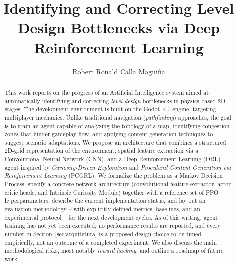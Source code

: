 \documentclass[sigconf,nonacm,language=english]{acmart}
\begin{document}
\title{Identifying and Correcting Level Design Bottlenecks via Deep Reinforcement Learning}

\author{Robert Ronald Calla Maguiña}

\renewcommand{\shortauthors}{Calla Maguiña}

\begin{abstract}
This work reports on the progress of an Artificial Intelligence system aimed
at automatically identifying and correcting \emph{level design} bottlenecks
in physics-based 2D stages. The development environment is built on the
Godot~4.7 engine, targeting multiplayer mechanics. Unlike traditional
navigation (\emph{pathfinding}) approaches, the goal is to train an agent
capable of analyzing the topology of a map, identifying congestion zones
that hinder gameplay flow, and applying content-generation techniques to
suggest scenario adaptations. We propose an architecture that combines a
structured 2D-grid representation of the environment, spatial feature
extraction via a Convolutional Neural Network (CNN), and a Deep
Reinforcement Learning (DRL) agent inspired by \emph{Curiosity-Driven
Exploration} and \emph{Procedural Content Generation via Reinforcement
Learning} (PCGRL). We formalize the problem as a Markov Decision Process,
specify a concrete network architecture (convolutional feature extractor,
actor-critic heads, and Intrinsic Curiosity Module) together with a
reference set of PPO hyperparameters, describe the current implementation
status, and lay out an evaluation methodology -- with explicitly defined
metrics, baselines, and an experimental protocol -- for the next
development cycles. As of this writing, agent training has not yet been
executed; no performance results are reported, and every number in
Section~\ref{sec:arquitetura} is a proposed design choice to be tuned
empirically, not an outcome of a completed experiment. We also discuss the
main methodological risks, most notably \emph{reward hacking}, and outline
a roadmap of future work.
\end{abstract}

\end{document}
